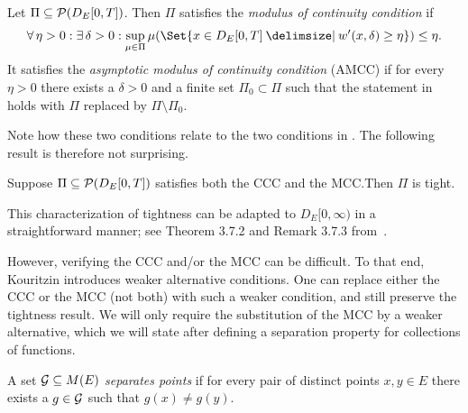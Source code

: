 \begin{definition}[MCC]\label{def:MCC}
  Let \( \Pi \subseteq \mathcal{P}(D_{E}[0,T]) \).
  Then \( \Pi \) satisfies the \textit{modulus of continuity condition} if
  \begin{equation}\label{eq:MCC}
    \forall \eta > 0 : \exists \delta > 0 : \sup_{\mu \in \Pi} \mu(\Set{x \in D_E[0,T] \given w'(x,\delta) \geq \eta}) \leq \eta.
  \end{equation}
  It satisfies the \textit{asymptotic modulus of continuity condition} (AMCC) if for every \( \eta > 0 \) there exists a \( \delta > 0 \) and a finite set \( \Pi_0 \subset \Pi \) such that the statement in  holds with \( \Pi \) replaced by \( \Pi \setminus \Pi_0 \).
\end{definition}

Note how these two conditions relate to the two conditions in .
The following result is therefore not surprising.

\begin{theorem}
  Suppose \( \Pi \subseteq \mathcal{P}(D_E[0,T]) \) satisfies both the CCC and the MCC.\@ Then \( \Pi \) is tight.
\end{theorem}

\begin{remark}
  This characterization of tightness can be adapted to \( D_E[0,\infty) \) in a straightforward manner; see Theorem 3.7.2 and Remark 3.7.3 from~\cite{ethierMarkovProcessesCharacterization1986}.
\end{remark}

However, verifying the CCC and/or the MCC can be difficult.
To that end, Kouritzin introduces weaker alternative conditions.
One can replace either the CCC or the MCC (not both) with such a weaker condition, and still preserve the tightness result.
We will only require the substitution of the MCC by a weaker alternative, which we will state after defining a separation property for collections of functions.

\begin{definition}\label{def:s.p.}
  A set \( \mathcal{G} \subseteq M(E) \) \textit{separates points} if for every pair of distinct points \( x, y \in E \) there exists a \( g \in \mathcal{G} \) such that \( g(x) \neq g(y) \).
\end{definition}


